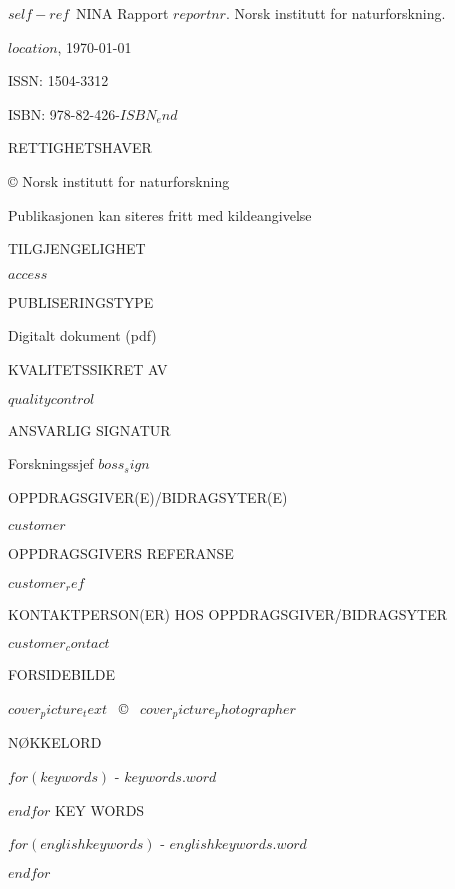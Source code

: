 \documentclass[11pt, a4paper]{article}
\newcommand{\smallspace}{\vspace{3mm}}
\begin{document}
\footnotesize{$self-ref$}~NINA Rapport $reportnr$. Norsk institutt for naturforskning. \par \smallspace
$location$, \ninadate\today \par \smallspace
ISSN: 1504-3312 \par
ISBN: 978-82-426-$ISBN_end$ \par  \smallspace
{\scriptsize{RETTIGHETSHAVER}} \par
© Norsk institutt for naturforskning  \par
Publikasjonen kan siteres fritt med kildeangivelse \par \smallspace
{\scriptsize{TILGJENGELIGHET}} \par
$access$ \par \smallspace
{\scriptsize{PUBLISERINGSTYPE}} \par
Digitalt dokument (pdf) \par \smallspace
{\scriptsize{KVALITETSSIKRET AV}} \par
$qualitycontrol$ \par \smallspace
{\scriptsize{ANSVARLIG SIGNATUR}} \par
Forskningssjef $boss_sign$ \par \smallspace
{\scriptsize{OPPDRAGSGIVER(E)/BIDRAGSYTER(E)}} \par
$customer$ \par \smallspace
{\scriptsize{OPPDRAGSGIVERS REFERANSE}} \par
$customer_ref$ \par \smallspace
{\scriptsize{KONTAKTPERSON(ER) HOS OPPDRAGSGIVER/BIDRAGSYTER}} \par
$customer_contact$ \par \smallspace
{\scriptsize{FORSIDEBILDE}} \par
$cover_picture_text$~ \copyright~ $cover_picture_photographer$ \par \smallspace
{\scriptsize{NØKKELORD}} \par\smallskip
$for(keywords)$
\small{\hyp{} $keywords.word$} \par
$endfor$
\vspace{5mm}
{\scriptsize{KEY WORDS}} \par\smallskip
$for(englishkeywords)$
\small{\hyp{} $englishkeywords.word$} \par
$endfor$

\vfill
\end{document}
